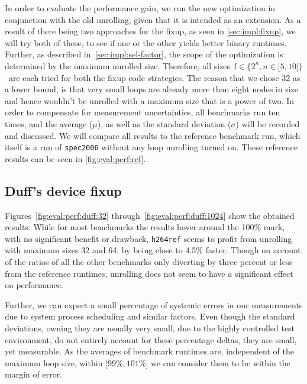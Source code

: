 In order to evaluate the performance gain, we run the new optimization in conjunction with the old unrolling, given that it is intended as an extension.
As a result of there being two approaches for the fixup, as seen in \cref{sec:impl:fixup}, we will try both of these, to see if one or the other yields better binary runtimes.
Further, as described in~\cref{sec:impl:sel-factor}, the scope of the optimization is determined by the maximum unrolled size.
Therefore, all sizes~$l \in \{2^n, n \in \lbrack 5, 10 \rbrack \}$~are each tried for both the fixup code strategies.
The reason that we chose 32 as a lower bound, is that very small loops are already more than eight nodes in size and hence wouldn't be unrolled with a maximum size that is a power of two.
In order to compensate for measurement uncertainties, all benchmarks run ten times, and the average ($\mu$), as well as the standard deviation ($\sigma$) will be recorded and discussed.
We will compare all results to the reference benchmark run, which itself is a run of \texttt{spec2006} without any loop unrolling turned on.
These reference results can be seen in \cref{fig:eval:perf:ref}.



\subsection{Duff's device fixup}\label{sec:eval:perf:duff}



Figures~\ref{fig:eval:perf:duff:32} through~\ref{fig:eval:perf:duff:1024} show the obtained results.
While for most benchmarks the results hover around the 100\% mark, with no significant benefit or drawback, \texttt{h264ref} seems to profit from unrolling with maximum sizes 32 and 64, by being close to 4.5\% faster.
Though on account of the ratios of all the other benchmarks only diverting by three percent or less from the reference runtimes, unrolling does not seem to have a significant effect on performance.

Further, we can expect a small percentage of systemic errors in our measurements due to system process scheduling and similar factors.
Even though the standard deviations, owning they are usually very small, due to the highly controlled test environment, do not entirely account for these percentage deltas, they are small, yet measurable.
As the averages of benchmark runtimes are, independent of the maximum loop size, within $\lbrack 99\%, 101\% \rbrack$ we can consider them to be within the margin of error.

